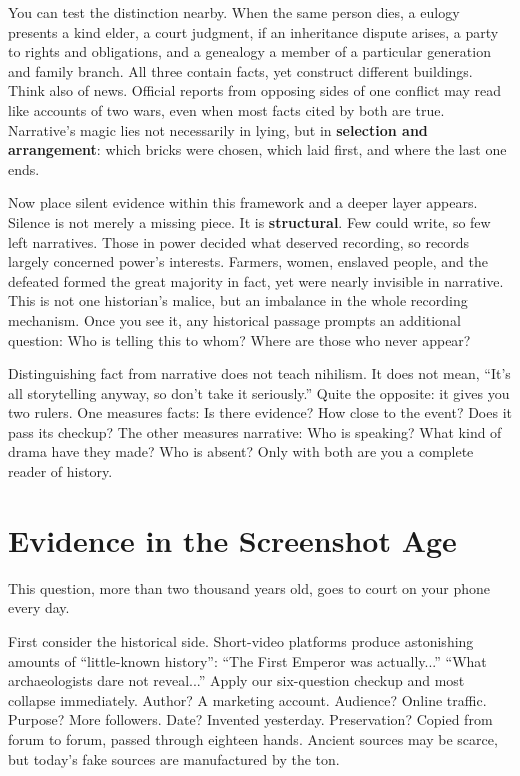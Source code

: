 You can test the distinction nearby. When the same person dies, a eulogy presents a kind elder, a court judgment, if an inheritance dispute arises, a party to rights and obligations, and a genealogy a member of a particular generation and family branch. All three contain facts, yet construct different buildings. Think also of news. Official reports from opposing sides of one conflict may read like accounts of two wars, even when most facts cited by both are true. Narrative's magic lies not necessarily in lying, but in \textbf{selection and arrangement}: which bricks were chosen, which laid first, and where the last one ends.

Now place silent evidence within this framework and a deeper layer appears. Silence is not merely a missing piece. It is \textbf{structural}. Few could write, so few left narratives. Those in power decided what deserved recording, so records largely concerned power's interests. Farmers, women, enslaved people, and the defeated formed the great majority in fact, yet were nearly invisible in narrative. This is not one historian's malice, but an imbalance in the whole recording mechanism. Once you see it, any historical passage prompts an additional question: Who is telling this to whom? Where are those who never appear?

Distinguishing fact from narrative does not teach nihilism. It does not mean, ``It's all storytelling anyway, so don't take it seriously.'' Quite the opposite: it gives you two rulers. One measures facts: Is there evidence? How close to the event? Does it pass its checkup? The other measures narrative: Who is speaking? What kind of drama have they made? Who is absent? Only with both are you a complete reader of history.

\section{Evidence in the Screenshot Age}
This question, more than two thousand years old, goes to court on your phone every day.

First consider the historical side. Short-video platforms produce astonishing amounts of ``little-known history'': ``The First Emperor was actually...'' ``What archaeologists dare not reveal...'' Apply our six-question checkup and most collapse immediately. Author? A marketing account. Audience? Online traffic. Purpose? More followers. Date? Invented yesterday. Preservation? Copied from forum to forum, passed through eighteen hands. Ancient sources may be scarce, but today's fake sources are manufactured by the ton.

